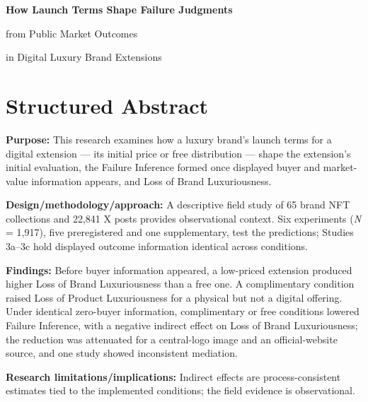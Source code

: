 \documentclass[12pt, a4paper]{article}
\begin{document}

{\centering\Large\bfseries
How Launch Terms Shape Failure Judgments\par
from Public Market Outcomes\par
in Digital Luxury Brand Extensions\par}

\section*{Structured Abstract}

\textbf{Purpose:} This research examines how a luxury brand's launch terms for a digital extension --- its initial price or free distribution --- shape the extension's initial evaluation, the Failure Inference formed once displayed buyer and market-value information appears, and Loss of Brand Luxuriousness.

\textbf{Design/methodology/approach:} A descriptive field study of 65 brand NFT collections and 22,841 X posts provides observational context. Six experiments (\emph{N} = 1,917), five preregistered and one supplementary, test the predictions; Studies 3a--3c hold displayed outcome information identical across conditions.

\textbf{Findings:} Before buyer information appeared, a low-priced extension produced higher Loss of Brand Luxuriousness than a free one. A complimentary condition raised Loss of Product Luxuriousness for a physical but not a digital offering. Under identical zero-buyer information, complimentary or free conditions lowered Failure Inference, with a negative indirect effect on Loss of Brand Luxuriousness; the reduction was attenuated for a central-logo image and an official-website source, and one study showed inconsistent mediation.

\textbf{Research limitations/implications:} Indirect effects are process-consistent estimates tied to the implemented conditions; the field evidence is observational.
\end{document}
